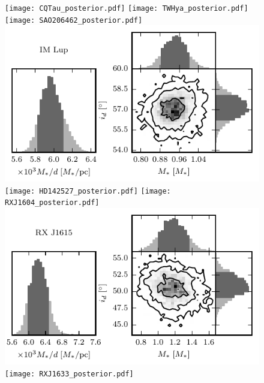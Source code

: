 \documentclass[twocolumn]{aastex6}
\begin{document}
\begin{figure}[htb]
\begin{center}
\texttt{[image: CQTau\_posterior.pdf]}
\texttt{[image: TWHya\_posterior.pdf]}
\texttt{[image: SAO206462\_posterior.pdf]}
\includegraphics{IMLup_posterior.pdf}
\texttt{[image: HD142527\_posterior.pdf]}
\texttt{[image: RXJ1604\_posterior.pdf]}
\includegraphics{RXJ1615_posterior.pdf}
\texttt{[image: RXJ1633\_posterior.pdf]}
\end{center}
\end{figure}
\end{document}
